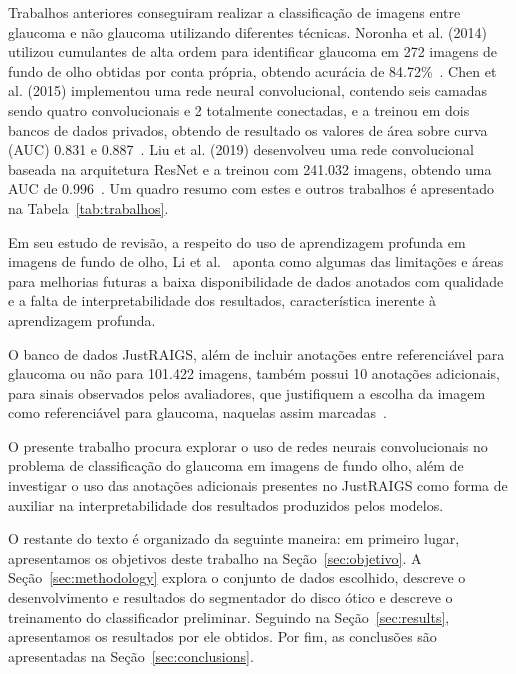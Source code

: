 \documentclass[12pt]{article}
\begin{document}
Trabalhos anteriores conseguiram realizar a classificação de imagens entre glaucoma e não glaucoma utilizando diferentes técnicas. Noronha et al. (2014) utilizou cumulantes de alta ordem para identificar glaucoma em 272 imagens de fundo de olho obtidas por conta própria, obtendo acurácia de 84.72\%~\cite{noronha2014hoc}. Chen et al. (2015) implementou uma rede neural convolucional, contendo seis camadas sendo quatro convolucionais e 2 totalmente conectadas, e a treinou em dois bancos de dados privados, obtendo de resultado os valores de área sobre curva (AUC) 0.831 e 0.887~\cite{chen2015cnn}. Liu et al. (2019) desenvolveu uma rede convolucional baseada na arquitetura ResNet e a treinou com 241.032 imagens, obtendo uma AUC de 0.996~\cite{liu_cnn_2019}. Um quadro resumo com estes e outros trabalhos é apresentado na Tabela~\ref{tab:trabalhos}.

Em seu estudo de revisão, a respeito do uso de aprendizagem profunda em imagens de fundo de olho, Li et al.~\cite{li_review_2021} aponta como algumas das limitações e áreas para melhorias futuras a baixa disponibilidade de dados anotados com qualidade e a falta de interpretabilidade dos resultados, característica inerente à aprendizagem profunda.

O banco de dados JustRAIGS, além de incluir anotações entre referenciável para glaucoma ou não para 101.422 imagens, também possui 10 anotações adicionais, para sinais observados pelos avaliadores, que justifiquem a escolha da imagem como referenciável para glaucoma, naquelas assim marcadas~\cite{justraigs_article}.

O presente trabalho procura explorar o uso de redes neurais convolucionais no problema de classificação do glaucoma em imagens de fundo olho, além de investigar o uso das anotações adicionais presentes no JustRAIGS como forma de auxiliar na interpretabilidade dos resultados produzidos pelos modelos.

O restante do texto é organizado da seguinte maneira: em primeiro lugar, apresentamos os objetivos deste trabalho na Seção~\ref{sec:objetivo}. A Seção~\ref{sec:methodology} explora o conjunto de dados escolhido, descreve o desenvolvimento e resultados do segmentador do disco ótico e descreve o treinamento do classificador preliminar. Seguindo na Seção~\ref{sec:results}, apresentamos os resultados por ele obtidos. Por fim, as conclusões são apresentadas na Seção~\ref{sec:conclusions}.
\end{document}

